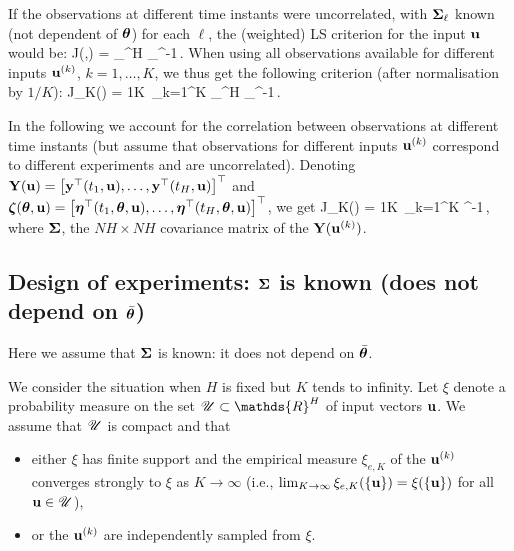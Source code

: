 \documentclass{article}
\newcommand{\B}[1]{{\textcolor{blue}{[Bruno: \textit{#1}]}}}
\newcommand{\Luccomment}[1]{\todo[color=yellow]{#1}}
\newcommand{\Luc}[1]{{\textcolor{magenta}{[Luc: \textit{#1}]}}}
\begin{document}
If the observations at different time instants were uncorrelated, with $\boldsymbol{\Sigma}_\ell$ known (not dependent of $\boldsymbol{\theta}$) for each $\ell$, 
the (weighted) LS criterion for the input $\mathbf{u}$ would be: 
\bea
J(\mtb,\ub) = \sum_{}^H \TT\Sigmab_\ell^{-1} \,.
\eea
When using all observations available for different inputs $\mathbf{u}^{(k)}$, $k=1,\ldots,K$, we thus get the following criterion (after normalisation by $1/K$):
\bea
J_K(\mtb) = \frac1K\, \sum_{k=1}^K \sum_{}^H \TT\Sigmab_\ell^{-1} \,.
\eea

In the following we account for the correlation between observations at different time instants (but assume that observations for different inputs $\mathbf{u}^{(k)}$ correspond to different experiments and are uncorrelated). 
Denoting $\mathbf{Y}(\mathbf{u})=\left[\mathbf{y}^\top(t_1,\mathbf{u}),\ldots,\mathbf{y}^\top(t_H,\mathbf{u})\right]^\top$ and $\boldsymbol{\zeta}(\boldsymbol{\theta},\mathbf{u})=\left[\boldsymbol{\eta}^\top(t_1,\boldsymbol{\theta},\mathbf{u}),\ldots,\boldsymbol{\eta}^\top(t_H,\boldsymbol{\theta},\mathbf{u})\right]^\top$, we get
\beq\label{LS-Sigma-known}
J_K(\mtb) = \frac1K\, \sum_{k=1}^K \TT \Sigmab^{-1} \,,
\eeq
where $\boldsymbol{\Sigma}$,
the $NH\times NH$ covariance matrix of the $\mathbf{Y}(\mathbf{u}^{(k)})$. %

\subsection{Design of experiments: $\boldsymbol{\Sigma}$ is known (does not depend on $\bar{\boldsymbol{\theta}}$)}\label{S:Sigma-known}

Here we assume that $\boldsymbol{\Sigma}$ is known: it does not depend on $\bar{\boldsymbol{\theta}}$.

We consider the situation when $H$ is fixed but $K$ tends to infinity. Let $\xi$ denote a probability measure on the set $\SU\subset \mathds{R}^H$ of input vectors $\mathbf{u}$. We assume that ${\mathscr U}$ is compact and that
\begin{itemize}
  \item either $\xi$ has finite support and the empirical measure $\xi_{e,K}$ of the $\mathbf{u}^{(k)}$ converges strongly to $\xi$ as $K\to\infty$ (i.e., $\lim_{K\to\infty}\xi_{e,K}(\{\mathbf{u}\})=\xi(\{\mathbf{u}\})$ for all $\mathbf{u}\in{\mathscr U}$),

  \item or the $\mathbf{u}^{(k)}$ are independently sampled from $\xi$.
\end{itemize}
\end{document}
